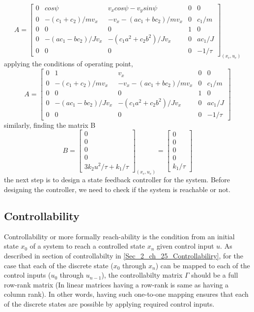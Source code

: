 \begin{equation}
	A = \begin{bmatrix}
	0 & cos\psi & v_x cos\psi - v_y sin\psi & 0 & 0 \\
	0 & -(c_1 + c_2)/m v_x & -v_x -(a c_1 + b c_2)/m v_x & 0 & c_1 / m \\
	0 & 0 & 0 & 1 & 0 \\
	0 & -(a c_1 - b c_2)/J v_x & - (c_1 a^2 + c_2 b^2)/J v_x & 0 & a c_1 / J \\
	0 & 0 & 0 & 0 & -1/\tau
	\end{bmatrix}_{(x_e, u_e)}
\end{equation}
applying the conditions of operating point,
\begin{equation}
	A = \begin{bmatrix}
	0 & 1 & v_x & 0 & 0 \\
	0 & -(c_1 + c_2)/m v_x & -v_x -(a c_1 + b c_2)/m v_x & 0 & c_1 / m \\
	0 & 0 & 0 & 1 & 0 \\
	0 & -(a c_1 - b c_2)/J v_x & - (c_1 a^2 + c_2 b^2)/J v_x & 0 & a c_1 / J \\
	0 & 0 & 0 & 0 & -1/\tau
	\end{bmatrix}
\end{equation}
similarly, finding the matrix B
\begin{equation}
	B = \begin{bmatrix}
	 0 \\ 0 \\ 0 \\ 0 \\ 3 k_2 u^2 / \tau + k_1 / \tau
	\end{bmatrix}_{(x_e, u_e)} = \begin{bmatrix}
	0 \\ 0 \\ 0 \\ 0 \\ k_1 / \tau
	\end{bmatrix}
\end{equation}
the next step is to design a state feedback controller for the system. Before designing the controller, we need to check if the system is reachable or not.

\subsection{Controllability}
Controllability or more formally reach-ability is the condition from an initial state $x_0$ of a system to reach a controlled state $x_n$ given control input $u$. As described in section of controllabilty in \ref{Sec_2_ch_25_Controllabiliry}, for the case that each of the discrete state ($x_0$ through $x_n$) can be mapped to each of the control inputs ($u_0$ through $u_{n-1}$), the controllabilty matrix $\Gamma$ should be a full row-rank matrix (In linear matrices having a row-rank is same as having a column rank). In other words, having such one-to-one mapping ensures that each of the discrete states are possible by applying required control inputs.

